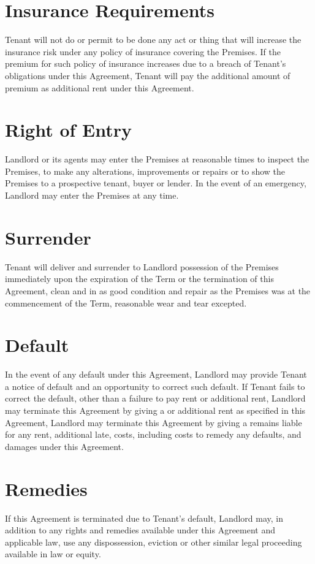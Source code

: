 \documentclass[12pt]{article}
\begin{document}
{\section{Insurance Requirements}
Tenant will not do or permit to be done any act or thing that will increase the insurance risk
under any policy of insurance covering the Premises. If the premium for such policy of
insurance increases due to a breach of Tenant's obligations under this Agreement, Tenant will
pay the additional amount of premium as additional rent under this Agreement.

\section{Right of Entry}
Landlord or its agents may enter the Premises at reasonable times to inspect the Premises, to
make any alterations, improvements or repairs or to show the Premises to a prospective tenant,
buyer or lender. In the event of an emergency, Landlord may enter the Premises at any time.

\section{Surrender}
Tenant will deliver and surrender to Landlord possession of the Premises immediately upon the
expiration of the Term or the termination of this Agreement, clean and in as good condition and
repair as the Premises was at the commencement of the Term, reasonable wear and tear excepted.

\section{Default}
In the event of any default under this Agreement, Landlord may provide Tenant a notice of
default and an opportunity to correct such default. If Tenant fails to correct the default,
other than a failure to pay rent or additional rent, Landlord may terminate this Agreement by
giving a %
or additional rent as specified in this Agreement, Landlord may terminate this Agreement by
giving a %
remains liable for any rent, additional late, costs, including costs to remedy any defaults,
and damages under this Agreement.

\section{Remedies}
If this Agreement is terminated due to Tenant's default, Landlord may, in addition to any
rights and remedies available under this Agreement and applicable law, use any dispossession,
eviction or other similar legal proceeding available in law or equity.

}
\end{document}
